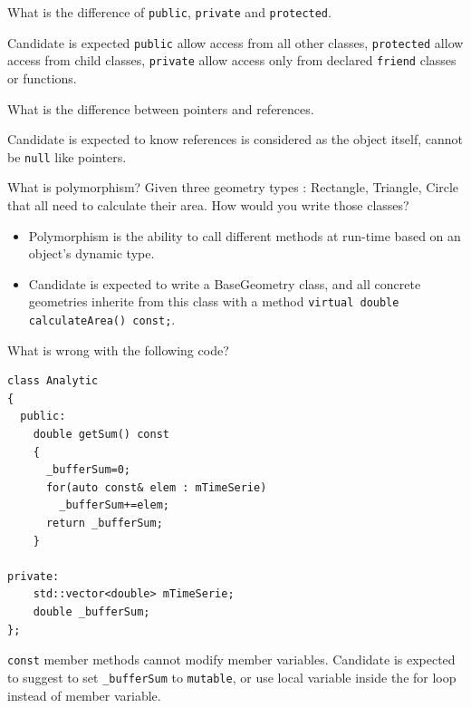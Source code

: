 \documentclass[answers]{exam}
\begin{document}
\begin{questions}
\question What is the difference of \lstinline{public}, \lstinline{private} and \lstinline{protected}.
\begin{solution}[.2in]
	Candidate is expected \lstinline{public} allow access from all other classes, \lstinline{protected} allow access from child classes, \lstinline{private} allow access only from declared \lstinline{friend} classes or functions.
\end{solution}

\question What is the difference between pointers and references.
\begin{solution}[.2in]
    Candidate is expected to know references is considered as the object itself, cannot be \lstinline{null} like pointers.
\end{solution}

\question What is polymorphism? Given three geometry types : Rectangle, Triangle, Circle that all need to calculate their area. How would you write those classes?
\begin{solution}[.2in]
\begin{itemize}
	\item Polymorphism is the ability to call different methods at run-time based on an object’s dynamic type. 
	\item Candidate is expected to write a BaseGeometry class, and all concrete geometries inherite from this class with a method \lstinline{virtual double calculateArea() const;}.
\end{itemize}
\end{solution}

\question What is wrong with the following code?
\begin{lstlisting}
class Analytic
{
  public:
    double getSum() const
    {
      _bufferSum=0;
      for(auto const& elem : mTimeSerie)
        _bufferSum+=elem;
      return _bufferSum;
    }

private:
    std::vector<double> mTimeSerie;
    double _bufferSum;
};

\end{lstlisting}
\begin{solution}[.2in]
\lstinline{const} member methods cannot modify member variables. Candidate is expected to suggest to set \lstinline{_bufferSum} to \lstinline{mutable}, or use local variable inside the for loop instead of member variable.
\end{solution}


\end{questions}
\end{document}
